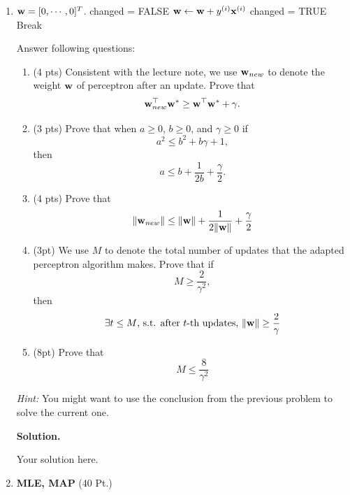 \documentclass{article}
\newcommand{\yup}[1]{y^{({#1})}}
\theoremstyle{definition}
\theoremstyle{remark}
\newenvironment{Q}
        {%
          \clearpage
          \item
        }
        {%
          \phantom{s} 
          \bigskip
        }
\begin{document}
\begin{enumerate}[font={\Large\bfseries},left=0pt]
\begin{Q}
\begin{enumerate}
\begin{algorithm}
\begin{algorithmic}[1]
     ${\bf w} = [0, \cdots, 0]^T$.
        \STATE changed = FALSE
                \STATE ${\bf w} \leftarrow {\bf w} +  \yup{i}{\bf x}^{(i)}$
                \STATE changed = TRUE
            \ENDIF
        \ENDFOR
            \STATE Break
        \ENDIF
    \ENDWHILE
    
    \end{algorithmic}
    \end{algorithm}

      
    Answer following questions:

    \begin{enumerate}
        \item (4 pts) Consistent with the lecture note, we use ${\bf w}_{new}$ to denote the weight ${\bf w}$ of perceptron after an update.  Prove that $${\bf w}_{new}^\top{\bf w}^*\geq {\bf w}^\top{\bf w}^*+\gamma.$$ 
        \item (3 pts) Prove that when $a \geq 0$, $b \geq 0$, and $\gamma \geq 0$ if 
\[
a^2 \leq b^2 + b\gamma + 1,
\]
then
\[
a \leq b + \frac{1}{2b} + \frac{\gamma}{2}.
\] 
        \item (4 pts) Prove that
        $$
            \|{\bf w}_{new}\|\leq\|{\bf w}\|+\frac{1}{2\|{\bf w}\|}+\frac{\gamma}{2}
        $$ 
        \item  (3pt) We use $M$ to denote the total number of updates that the adapted perceptron algorithm makes. Prove that if $$M\geq\frac{2}{\gamma^2},$$ then
        $$
            \exists t\leq M\text{, s.t. after $t$-th updates, } \|{\bf w}\|\geq\frac{2}{\gamma}
        $$
        \item  (8pt) Prove that 
        $$
            M \leq \frac{8}{\gamma^2}
        $$ 
    \end{enumerate}
    \textit{Hint: }You might want to use the conclusion from the previous problem to solve the current one.
    


\end{enumerate}
\end{Q}

\textbf{Solution.}
    \begin{tcolorbox}
    Your solution here.
    \end{tcolorbox}


\begin{Q}
\textbf{\Large MLE, MAP} (40 Pt.)
\begin{enumerate}



\end{enumerate}
\end{Q}
\end{enumerate}
\end{document}
